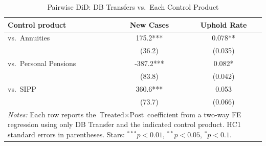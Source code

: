 \begin{table}[t]
\centering
\caption{Pairwise DiD: DB Transfers vs.\ Each Control Product}
\label{tab:pairwise}
\begin{tabular}{lcc}
\hline\hline
Control product & New Cases & Uphold Rate \\
\hline
vs.\ Annuities & 175.2*** & 0.078** \\
& (36.2) & (0.035) \\
vs.\ Personal Pensions & -387.2*** & 0.082* \\
& (83.8) & (0.042) \\
vs.\ SIPP & 360.6*** & 0.053 \\
& (73.7) & (0.066) \\
\hline\hline
\multicolumn{3}{p{0.75\textwidth}}{\footnotesize \textit{Notes:} Each row reports the $\text{Treated} \times \text{Post}$ coefficient from a two-way FE regression using only DB Transfer and the indicated control product. HC1 standard errors in parentheses. Stars: $^{***}p<0.01$, $^{**}p<0.05$, $^{*}p<0.1$.}
\end{tabular}
\end{table}
